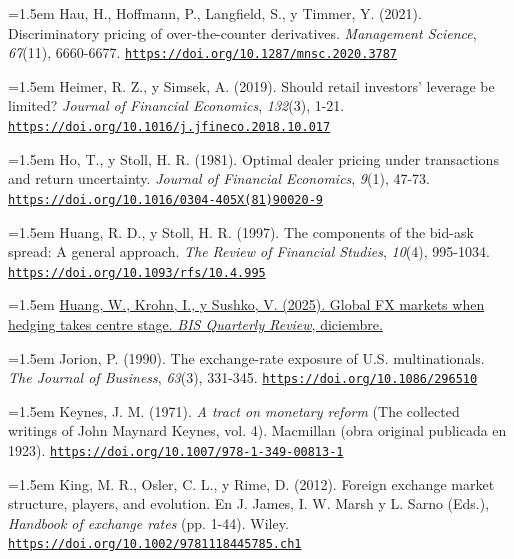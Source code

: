 \documentclass[10pt,a4paper]{article}
\begin{document}
\noindent\hangindent=1.5em Hau, H., Hoffmann, P., Langfield, S., y Timmer, Y. (2021). Discriminatory pricing of over-the-counter derivatives. \textit{Management Science}, \textit{67}(11), 6660-6677. \href{https://doi.org/10.1287/mnsc.2020.3787}{\nolinkurl{https://doi.org/10.1287/mnsc.2020.3787}}

\noindent\hangindent=1.5em Heimer, R. Z., y Simsek, A. (2019). Should retail investors' leverage be limited? \textit{Journal of Financial Economics}, \textit{132}(3), 1-21. \href{https://doi.org/10.1016/j.jfineco.2018.10.017}{\nolinkurl{https://doi.org/10.1016/j.jfineco.2018.10.017}}

\noindent\hangindent=1.5em Ho, T., y Stoll, H. R. (1981). Optimal dealer pricing under transactions and return uncertainty. \textit{Journal of Financial Economics}, \textit{9}(1), 47-73. \href{https://doi.org/10.1016/0304-405X(81)90020-9}{\nolinkurl{https://doi.org/10.1016/0304-405X(81)90020-9}}

\noindent\hangindent=1.5em Huang, R. D., y Stoll, H. R. (1997). The components of the bid-ask spread: A general approach. \textit{The Review of Financial Studies}, \textit{10}(4), 995-1034. \href{https://doi.org/10.1093/rfs/10.4.995}{\nolinkurl{https://doi.org/10.1093/rfs/10.4.995}}

\noindent\hangindent=1.5em \href{https://www.bis.org/publ/qtrpdf/r_qt2512b.htm}{Huang, W., Krohn, I., y Sushko, V. (2025). Global FX markets when hedging takes centre stage. \textit{BIS Quarterly Review}, diciembre.}

\noindent\hangindent=1.5em Jorion, P. (1990). The exchange-rate exposure of U.S. multinationals. \textit{The Journal of Business}, \textit{63}(3), 331-345. \href{https://doi.org/10.1086/296510}{\nolinkurl{https://doi.org/10.1086/296510}}

\noindent\hangindent=1.5em Keynes, J. M. (1971). \textit{A tract on monetary reform} (The collected writings of John Maynard Keynes, vol. 4). Macmillan (obra original publicada en 1923). \href{https://doi.org/10.1007/978-1-349-00813-1}{\nolinkurl{https://doi.org/10.1007/978-1-349-00813-1}}

{\sloppy\noindent\hangindent=1.5em King, M. R., Osler, C. L., y Rime, D. (2012). Foreign exchange market structure, players, and evolution. En J. James, I. W. Marsh y L. Sarno (Eds.), \textit{Handbook of exchange rates} (pp. 1-44). Wiley. \href{https://doi.org/10.1002/9781118445785.ch1}{\nolinkurl{https://doi.org/10.1002/9781118445785.ch1}}\par}
\end{document}
